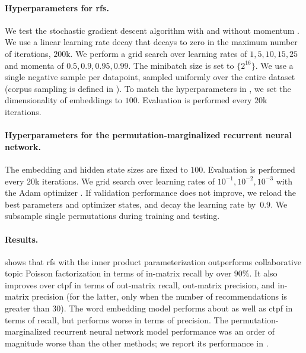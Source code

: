 \paragraph{Hyperparameters for \gls{rfs}.} We test the stochastic gradient
descent algorithm with and without momentum
\citep{sutskever2013on-the-importance}. We use a linear learning rate decay that
decays to zero in the maximum number of iterations, $200$k. We perform a grid
search over learning rates of ${1, 5, 10, 15, 25}$ and momenta of
${0.5, 0.9, 0.95, 0.99}$. The minibatch size is set to $\{2^{16}\}$. We use a
single negative sample per datapoint, sampled uniformly over the entire dataset
(corpus sampling is defined in ). To
match the hyperparameters in \citet{gopalan2014content-based}, we set the
dimensionality of embeddings to $100$. Evaluation is performed every $20$k
iterations.

\paragraph{Hyperparameters for the permutation-marginalized recurrent neural
  network.} The embedding and hidden state sizes are fixed to $100$. Evaluation
is performed every $20$k iterations. We grid search over learning rates of
${10^{-1}, 10^{-2}, 10^{-3}}$ with the Adam optimizer \cite{kingma2015adam:}. If
validation performance does not improve, we reload the best parameters and
optimizer states, and decay the learning rate by~$0.9$. We subsample single
permutations during training and testing.


\paragraph{Results.}  shows that \gls{rfs} with the
inner product parameterization outperforms collaborative topic Poisson
factorization in terms of in-matrix recall by over $90\%$. It also improves over
\gls{ctpf} in terms of out-matrix recall, out-matrix precision, and in-matrix
precision (for the latter, only when the number of recommendations is greater
than $30$). The word embedding model performs about as well as \gls{ctpf} in
terms of recall, but performs worse in terms of precision. The
permutation-marginalized recurrent neural network model performance was an order
of magnitude worse than the other methods; we report its performance in
.

